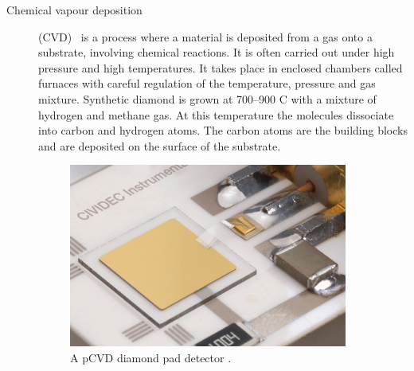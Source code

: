 \begin{description}
\item[Chemical vapour deposition] (CVD)~\cite{} is a process where a material is deposited from a gas onto a substrate, involving chemical reactions. It is often carried out under high pressure and high temperatures. It takes place in enclosed chambers called furnaces with careful regulation of the temperature, pressure and gas mixture. Synthetic diamond is grown at 700--900 \textdegree C with a mixture of hydrogen and methane gas. At this temperature the molecules dissociate into carbon and hydrogen atoms. The carbon atoms are the building blocks and are deposited on the surface of the substrate.

\begin{figure}[!t]
\centering
\includegraphics[width=0.9\textwidth]{01_introduction/pics/cividecpcvd}
\caption{A pCVD diamond pad detector \cite{Cividec:00000}.}
\label{fig:cividecpcvd}
\end{figure}


\end{description}
